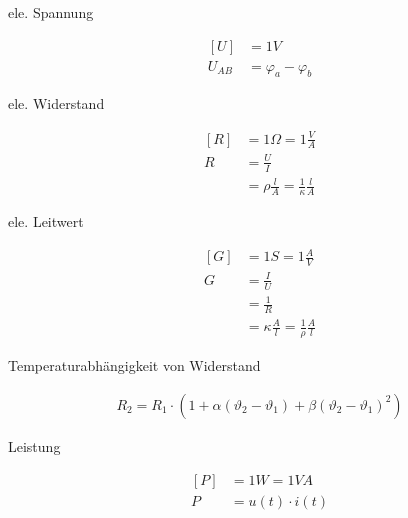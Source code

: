 \begin{boxleft}ele. Spannung
\end{boxleft}\begin{boxrightshaded}
\begin{align}
\left[U\right]&=1V\\
U_{AB}&=\varphi_a-\varphi_b
\end{align}
\end{boxrightshaded}

\begin{boxleft}ele. Widerstand
\end{boxleft}\begin{boxrightshaded}
\begin{align}
\left[R\right]&=1\Omega=1\frac{V}{A}\\
R&=\frac{U}{I}\\
&=\rho\frac{l}{A}=\frac{1}{\kappa}\frac{l}{A}
\end{align}
\end{boxrightshaded}

\begin{boxleft}ele. Leitwert
\end{boxleft}\begin{boxrightshaded}
\begin{align}
\left[G\right]&=1S=1\frac{A}{V}\\
G&=\frac{I}{U}\\
&=\frac{1}{R}\\
&=\kappa\frac{A}{l}=\frac{1}{\rho}\frac{A}{l}
\end{align}
\end{boxrightshaded}

\begin{boxleft}Temperaturabhängigkeit von Widerstand
\end{boxleft}\begin{boxrightshaded}
\begin{align}
R_2=R_1\cdot\left(1+\alpha\left(\vartheta_2-\vartheta_1\right)+\beta\left(\vartheta_2-\vartheta_1\right)^2\right)
\end{align}
\end{boxrightshaded}

\begin{boxleft}Leistung
\end{boxleft}\begin{boxrightshaded}
\begin{align}
\left[P\right]&=1W=1VA\\
P&=u(t)\cdot i(t)
\end{align}
\end{boxrightshaded}

